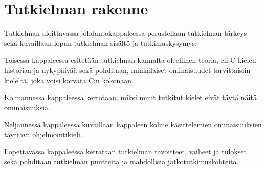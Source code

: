 \section{Tutkielman rakenne} 

Tutkielman aloittavassa johdantokappaleessa perustellaan tutkielman tärkeys
sekä kuvaillaan lopun tutkielman sisältö ja tutkimuskysymys.

Toisessa kappaleessa esitetään tutkielman kannalta oleellinen teoria, eli
C-kielen historiaa ja nykypäivää sekä pohditaan, minkälaiset ominaisuudet
tarvittaisiin kieleltä, joka voisi korvata C:n kokonaan.

Kolmannessa kappaleessa kerrotaan, miksi muut tutkitut kielet eivät täytä näitä
ominaisuuksia.

Neljännessä kappaleessa kuvaillaan kappaleen kolme käsittelemien ominaisuuksien
täyttävä ohjelmointikieli.

Lopettavassa kappaleessa kerrataan tutkielman tavoitteet, vaiheet ja tulokset
sekä pohditaan tutkielman puutteita ja mahdollisia jatkotutkimuskohteita.
